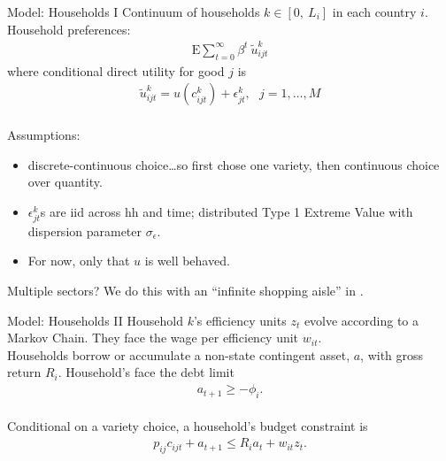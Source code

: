\documentclass[9pt,pdftex,aspectratio=1610]{beamer}
\theoremstyle{definition}
\begin{document}

\begin{frame}[t]{Model: Households I}
\smallskip
Continuum of households $k \in [0, \ L_i]$ in each country $i$. Household preferences:
\begin{align*}
\mathrm{E}\sum_{t = 0}^{\infty} \beta^{t} \ \tilde{u}^k_{ijt}
\end{align*}
where conditional direct utility for good $j$ is
\begin{align*}
\tilde{u}^k_{ijt} =  u(c^k_{ijt}) + \epsilon^k_{jt}, \ \ \ j = 1, \ldots, M
\end{align*}\\
\medskip
Assumptions:
\begin{itemize}
\item discrete-continuous choice\ldots so first chose one variety, then continuous choice over quantity.
\smallskip
\item $\epsilon^k_{jt}$s are iid across hh and time; distributed Type 1 Extreme Value with dispersion parameter $\sigma_{\epsilon}$.
\smallskip
\item For now, only that $u$ is well behaved.
\end{itemize}
\bigskip
Multiple sectors? We do this with an ``infinite shopping aisle'' in \citet{p-iq}.
\end{frame}


\begin{frame}[t]{Model: Households II}
\smallskip
Household $k$'s efficiency units $z_t$ evolve according to a Markov Chain. They face the wage per efficiency unit $w_{it}$.\\
\bigskip
\medskip
Households borrow or accumulate a non-state contingent asset, $a$, with gross return $R_{i}$. Household's face the debt limit
\begin{align*}
a_{t+1} \geq - \phi_{i}.
\end{align*}\\
\bigskip
\medskip
Conditional on a variety choice, a household's budget constraint is
\begin{align*}
p_{ij}c_{ijt} +  a_{t+1} \leq    R_{i} a_{t} + w_{it} z_{t}.
\end{align*}
\end{frame}
\end{document}
